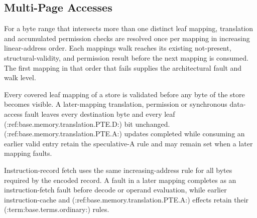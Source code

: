 \subsection{Multi-Page Accesses}
For a byte range that intersects more than one distinct leaf mapping, translation and accumulated permission checks
are resolved once per mapping in increasing linear-address order. Each
mapping\textquotesingle{}s walk reaches its existing not-present, structural-validity, and permission result before the next mapping
is consumed. The first mapping in that order that fails supplies the architectural fault and walk level.

Every covered leaf mapping of a store is validated before any byte of the store becomes visible. A later-mapping translation,
permission or synchronous data-access fault leaves every destination byte and every leaf (:ref:base.memory.translation.PTE.D:) bit
unchanged. (:ref:base.memory.translation.PTE.A:) updates completed while consuming an earlier valid entry retain the speculative-A rule and may remain
set when a later mapping faults.

Instruction-record fetch uses the same increasing-address rule for all bytes required by the encoded record. A fault
in a later mapping completes as an instruction-fetch fault before decode or operand evaluation, while earlier
instruction-cache and (:ref:base.memory.translation.PTE.A:) effects retain their (:term:base.terms.ordinary:) rules.
